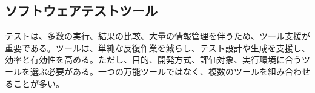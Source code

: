 \subsection{ソフトウェアテストツール}
テストは、多数の実行、結果の比較、大量の情報管理を伴うため、ツール支援が重要である。ツールは、単純な反復作業を減らし、テスト設計や生成を支援し、効率と有効性を高める。ただし、目的、開発方式、評価対象、実行環境に合うツールを選ぶ必要がある。一つの万能ツールではなく、複数のツールを組み合わせることが多い。
